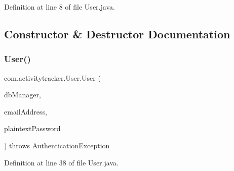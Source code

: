 Definition at line 8 of file User.\+java.



\subsection{Constructor \& Destructor Documentation}
\mbox{\label{classcom_1_1activitytracker_1_1_user_ae9f2a2555aa41e80ade28223907e01ab}} 
\subsubsection{\texorpdfstring{User()}{User()}}
{\footnotesize\ttfamily com.\+activitytracker.\+User.\+User (\begin{DoxyParamCaption}\item[{final \mbox{\hyperlink{classcom_1_1activitytracker_1_1_d_b_manager}{D\+B\+Manager}}}]{db\+Manager,  }\item[{final String}]{email\+Address,  }\item[{final String}]{plaintext\+Password }\end{DoxyParamCaption}) throws Authentication\+Exception\hspace{0.3cm}{\ttfamily [package]}}



Definition at line 38 of file User.\+java.


